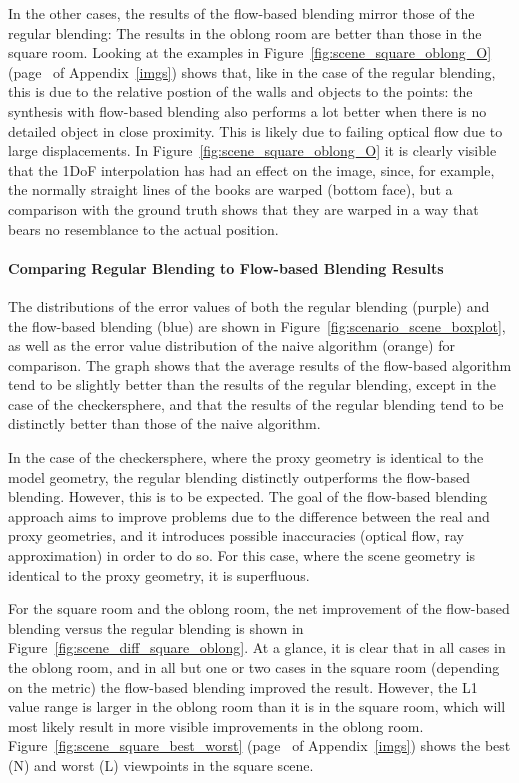 In the other cases, the results of the flow-based blending mirror those of the regular blending: The results in the oblong room are better than those in the square room. Looking at the examples in Figure~\ref{fig:scene_square_oblong_O} (page~\pageref{fig:scene_square_oblong_O} of Appendix~\ref{imgs}) shows that, like in the case of the regular blending, this is due to the relative postion of the walls and objects to the points: the synthesis with flow-based blending also performs a lot better when there is no detailed object in close proximity. This is likely due to failing optical flow due to large displacements. In Figure~\ref{fig:scene_square_oblong_O} it is clearly visible that the 1DoF interpolation has had an effect on the image, since, for example, the normally straight lines of the books are warped (bottom face), but a comparison with the ground truth shows that they are warped in a way that bears no resemblance to the actual position.

\paragraph{Comparing Regular Blending to Flow-based Blending Results}
The distributions of the error values of both the regular blending (purple) and the flow-based blending (blue) are shown in Figure~\ref{fig:scenario_scene_boxplot}, as well as the error value distribution of the naive algorithm (orange) for comparison\footnotemark. The graph shows that the average results of the flow-based algorithm tend to be slightly better than the results of the regular blending, except in the case of the checkersphere, and that the results of the regular blending tend to be distinctly better than those of the naive algorithm. 

In the case of the checkersphere, where the proxy geometry is identical to the model geometry, the regular blending distinctly outperforms the flow-based blending. However, this is to be expected. The goal of the flow-based blending approach aims to improve problems due to the difference between the real and proxy geometries, and it introduces possible inaccuracies (optical flow, ray approximation) in order to do so. For this case, where the scene geometry is identical to the proxy geometry, it is superfluous.

For the square room and the oblong room, the net improvement of the flow-based blending versus the regular blending is shown in Figure~\ref{fig:scene_diff_square_oblong}. At a glance, it is clear that in all cases in the oblong room, and in all but one or two cases in the square room (depending on the metric) the flow-based blending improved the result. However, the L1 value range is larger in the oblong room than it is in the square room, which will most likely result in more visible improvements in the oblong room. Figure~\ref{fig:scene_square_best_worst} (page~\pageref{fig:scene_square_best_worst} of Appendix~\ref{imgs}) shows the best (N) and worst (L) viewpoints in the square scene.

